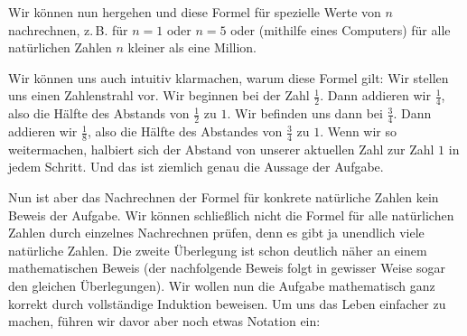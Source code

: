 \documentclass[a4paper,ngerman,12pt]{scrartcl}
\theoremstyle{definition}
\begin{document}
Wir können nun hergehen und diese Formel für spezielle Werte von $n$ nachrechnen, z.\,B. für $n=1$ oder $n=5$ oder (mithilfe eines Computers) für alle natürlichen Zahlen $n$ kleiner als eine Million.

Wir können uns auch intuitiv klarmachen, warum diese Formel gilt: Wir stellen uns einen Zahlenstrahl vor. Wir beginnen bei der Zahl $\frac{1}{2}$. Dann addieren wir $\frac{1}{4}$, also die Hälfte des Abstands von $\frac{1}{2}$ zu $1$. Wir befinden uns dann bei $\frac{3}{4}$. Dann addieren wir $\frac{1}{8}$, also die Hälfte des Abstandes von $\frac{3}{4}$ zu $1$. Wenn wir so weitermachen, halbiert sich der Abstand von unserer aktuellen Zahl zur Zahl $1$ in jedem Schritt. Und das ist ziemlich genau die Aussage der Aufgabe.

Nun ist aber das Nachrechnen der Formel für konkrete natürliche Zahlen kein Beweis der Aufgabe. Wir können schließlich nicht die Formel für alle natürlichen Zahlen durch einzelnes Nachrechnen prüfen, denn es gibt ja unendlich viele natürliche Zahlen. Die zweite Überlegung ist schon deutlich näher an einem mathematischen Beweis (der nachfolgende Beweis folgt in gewisser Weise sogar den gleichen Überlegungen). Wir wollen nun die Aufgabe mathematisch ganz korrekt durch vollständige Induktion beweisen. Um uns das Leben einfacher zu machen, führen wir davor aber noch etwas Notation ein:
\end{document}

